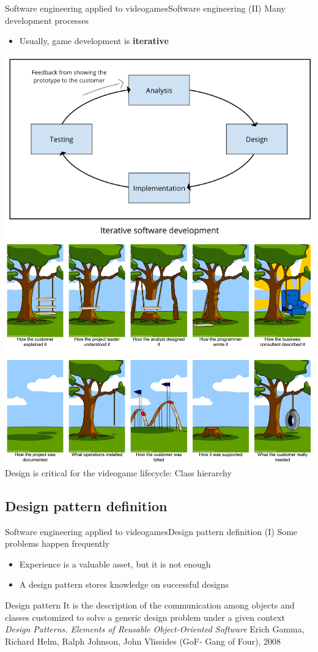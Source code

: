 \documentclass[10pt,compress]{beamer} %
\begin{document}
\begin{frame}{Software engineering applied to videogames}{Software engineering (II)}
	Many development processes
	\begin{itemize}
		\item Usually, game development is \textbf{iterative}
  	\end{itemize}
	\bigskip
			\centering\includegraphics[width=0.58\linewidth]{figs/iterative}
			\centering\includegraphics[width=0.48\linewidth]{figs/cartoon}\\
	\normalsize{Design is critical for the videogame lifecycle: Class hierarchy}
\end{frame}

\subsection[Design pattern definition]{Design pattern definition}
\begin{frame}{Software engineering applied to videogames}{Design pattern definition (I)}
	Some problems happen frequently
	\begin{itemize}
		\item Experience is a valuable asset, but it is not enough
		\item A \alert{design pattern} stores knowledge on successful designs
  	\end{itemize}
	\begin{block}{Design pattern}
		It is the description of the communication among objects and classes customized to solve a generic design problem under a given context\\
		\scriptsize{\textit{Design Patterns. Elements of Reusable Object-Oriented Software}
		Erich Gamma, Richard Helm, Ralph Johnson, John Vlissides (GoF- Gang of Four), 2008}
	\end{block}
\end{frame}
\end{document}
